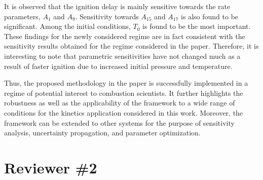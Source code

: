\documentclass[11pt,final]{article}
\begin{document}
\begin{enumerate}[wide, labelwidth=!, labelindent=0pt]
\begin{figure}[htbp]
\begin{center}
\caption{} 
\label{fig:as}
\end{center}
\end{figure}
%
It is observed that the ignition delay is mainly sensitive towards the rate parameters, $A_1$ and $A_9$. Sensitivity
towards $A_{15}$ and $A_{17}$ is also found to be significant. Among the initial conditions, $T_0$ is found to be
the most important. These findings for the newly considered regime are in fact consistent with the sensitivity results
obtained for the regime considered in the paper. Therefore, it is interesting to note that parametric sensitivities have
not changed much as a result of faster ignition due to increased initial pressure and temperature. 

Thus, the proposed methodology in the paper is successfully implemented in a regime of potential interest to
combustion scientists. It further highlights the robustness as well as the applicability of the framework to a wide
range of conditions for the kinetics application considered in this work. Moreover, the framework can be extended
to other systems
for the purpose of sensitivity analysis, uncertainty propagation, and parameter optimization. 

\end{enumerate}

\section*{Reviewer \#2}
\end{document}
